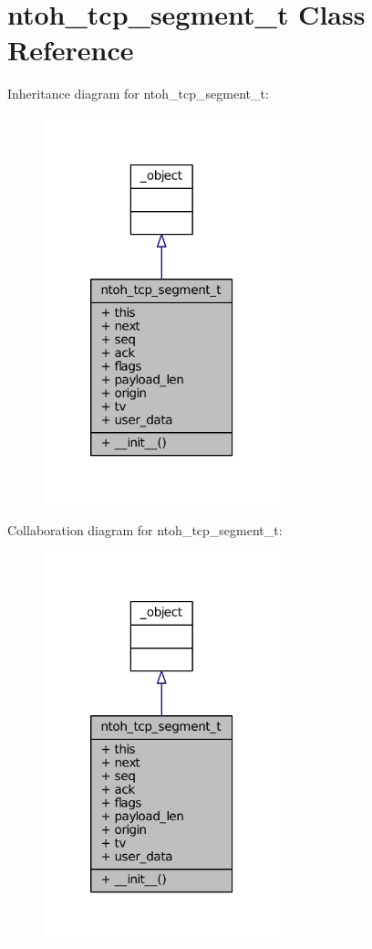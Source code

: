\hypertarget{classlibntoh_1_1ntoh__tcp__segment__t}{\section{ntoh\-\_\-tcp\-\_\-segment\-\_\-t Class Reference}
\label{classlibntoh_1_1ntoh__tcp__segment__t}
}


Inheritance diagram for ntoh\-\_\-tcp\-\_\-segment\-\_\-t\-:
\nopagebreak
\begin{figure}[H]
\begin{center}
\leavevmode
\includegraphics[width=194pt]{classlibntoh_1_1ntoh__tcp__segment__t__inherit__graph}
\end{center}
\end{figure}


Collaboration diagram for ntoh\-\_\-tcp\-\_\-segment\-\_\-t\-:
\nopagebreak
\begin{figure}[H]
\begin{center}
\leavevmode
\includegraphics[width=194pt]{classlibntoh_1_1ntoh__tcp__segment__t__coll__graph}
\end{center}
\end{figure}
